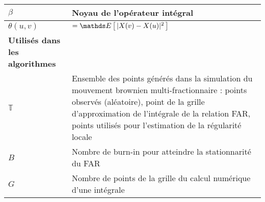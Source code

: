 \begin{table}[H]
\begin{tabularx}{\textwidth}{lX}
		$\beta$                                                                                         & Noyau de l'opérateur intégral                                                                                                                                                                                                                                                                                                               \\
		\midrule
		$\theta(u,v)$                                                                                   & $= \esperance{ |X(v) - X(u)|^2 }$                                                                                                                                                                                                                                                                                                           \\
		\toprule
		\textbf{Utilisés dans les algorithmes}                                                   		&                                                                                                                                                                                                                                                                                                                                             \\
		\midrule
		$\mathds T$                                                                                     & Ensemble des points générés dans la simulation du mouvement brownien multi-fractionnaire : points observés (aléatoire), point de la grille d'approximation de l'intégrale de la relation FAR, points utilisés pour l'estimation de la régularité locale                                                                                     \\
		$B$                                                                                             & Nombre de burn-in pour atteindre la stationnarité du FAR                                                                                                                                                                                                                                                                                    \\
		$G$                                                                                             & Nombre de points de la grille du calcul numérique d'une intégrale                                                                                                                                                                                                                                                                           \\

\end{tabularx}
\end{table}
